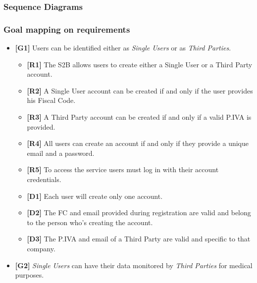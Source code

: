 \documentclass[titlepage]{article}
\begin{document}
			\subsubsection{Sequence Diagrams}
									
			\subsubsection{Goal mapping on requirements}
			
			\begin{itemize} %

   				 \item {\bf [G1]} Users can be identified either as {\it Single Users} or as {\it Third Parties}.	
				 
				 	\begin{itemize} %
						\item {\bf[R1]} The S2B allows users to create either a Single User or a Third Party account. 
\item {\bf[R2]}  A Single User account can be created if and only if the user provides his Fiscal Code. 
\item {\bf[R3]}  A Third Party account can be created if and only if a valid P.IVA is provided. 
\item {\bf[R4]}  All users can create an account if and only if they provide a unique email and a password. 
\item {\bf[R5]}  To access the service users must log in with their account credentials. 
\item {\bf[D1]}  Each user will create only one account.
\item {\bf[D2]}  The FC and email provided during registration are valid and belong to the person who’s creating the account.
\item {\bf[D3]}  The P.IVA and email of a Third Party are valid and specific to that company.
					\end{itemize}
   				 \item {\bf [G2]}  {\it Single Users} can have their data monitored by {\it Third Parties} for medical purposes.
				 

\end{itemize}
\end{document}
